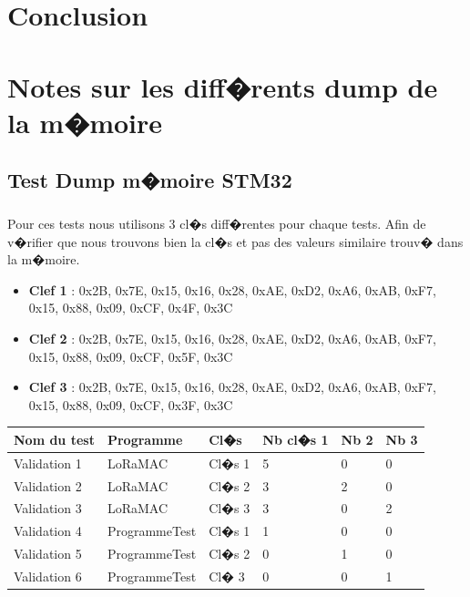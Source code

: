 \documentclass[a4paper, titlepage,12pt]{report}
\begin{document}
\paragraph{}

\chapter{Conclusion}



\listoffigures
\pagebreak

\pagebreak
\appendix	%
\chapter{Notes sur les diff�rents dump de la m�moire}
\label{notedumpmemoire}

\section{Test Dump m�moire STM32}
\paragraph{}
Pour ces tests nous utilisons 3 cl�s diff�rentes pour chaque tests. Afin de v�rifier que nous trouvons bien la cl�s et pas des valeurs similaire trouv� dans la m�moire.

\begin{itemize}
\item \textbf{Clef 1} : 0x2B, 0x7E, 0x15, 0x16, 0x28, 0xAE, 0xD2, 0xA6, 0xAB, 0xF7, 0x15, 0x88, 0x09, 0xCF, 0x4F, 0x3C
\item \textbf{Clef 2} : 0x2B, 0x7E, 0x15, 0x16, 0x28, 0xAE, 0xD2, 0xA6, 0xAB, 0xF7, 0x15, 0x88, 0x09, 0xCF, 0x5F, 0x3C
\item \textbf{Clef 3} : 0x2B, 0x7E, 0x15, 0x16, 0x28, 0xAE, 0xD2, 0xA6, 0xAB, 0xF7, 0x15, 0x88, 0x09, 0xCF, 0x3F, 0x3C
\end{itemize}

\begin{table}[]
\begin{tabular}{|l|l|l|l|l|l|}
\hline
Nom du test  & Programme     & Cl�s   & Nb cl�s 1 & Nb 2 & Nb 3 \\ \hline
Validation 1 & LoRaMAC       & Cl�s 1 & 5         & 0    & 0    \\ \hline
Validation 2 & LoRaMAC       & Cl�s 2 & 3         & 2    & 0    \\ \hline
Validation 3 & LoRaMAC       & Cl�s 3 & 3         & 0    & 2    \\ \hline
Validation 4 & ProgrammeTest & Cl�s 1 & 1         & 0    & 0    \\ \hline
Validation 5 & ProgrammeTest & Cl�s 2 & 0         & 1    & 0    \\ \hline
Validation 6 & ProgrammeTest & Cl� 3  & 0         & 0    & 1    \\ \hline
\end{tabular}
\end{table}
\end{document}
